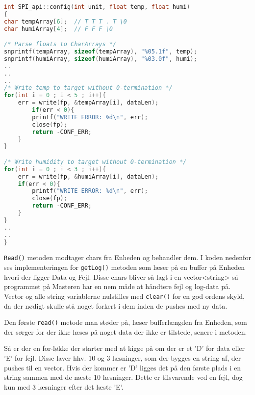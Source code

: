 \begin{lstlisting}[language=C]
int SPI_api::config(int unit, float temp, float humi)
{
char tempArray[6];	// T T T . T \0
char humiArray[4];	// F F F \0

/* Parse floats to CharArrays */
snprintf(tempArray, sizeof(tempArray), "%05.1f", temp);
snprintf(humiArray, sizeof(humiArray), "%03.0f", humi);
..
..
..
/* Write temp to target without 0-termination */
for(int i = 0 ; i < 5 ; i++){
	err = write(fp, &tempArray[i], dataLen);
		if(err < 0){
		printf("WRITE ERROR: %d\n", err);
		close(fp);
		return -CONF_ERR;
	}
}

/* Write humidity to target without 0-termination */	
for(int i = 0 ; i < 3 ; i++){		
	err = write(fp, &humiArray[i], dataLen);
	if(err < 0){
		printf("WRITE ERROR: %d\n", err);
		close(fp);
		return -CONF_ERR;
	}
}
..
..
}
\end{lstlisting}

\verb+Read()+ metoden modtager chars fra Enheden og behandler dem. I koden nedenfor ses implementeringen for \verb+getLog()+ metoden som læser på en buffer på Enheden hvori der ligger Data og Fejl. Disse chars bliver så lagt i en vector<string> så programmet på Masteren har en nem måde at håndtere fejl og log-data på. Vector og alle string variablerne nulstilles med \verb+clear()+ for en god ordens skyld, da der nødigt skulle stå noget forkert i dem inden de pushes med ny data.

Den første \verb+read()+ metode man støder på, læser bufferlængden fra Enheden, som der sørger for der ikke læses på noget data der ikke er tilstede, senere i metoden.

Så er der en for-løkke der starter med at kigge på om der er et 'D' for data eller 'E' for fejl. Disse laver hhv. 10 og 3 læsninger, som der bygges en string af, der pushes til en vector. Hvis der kommer er 'D' ligges det på den første plads i en string sammen med de næste 10 læsninger. Dette er tilsvarende ved en fejl, dog kun med 3 læsninger efter det læste 'E'.

